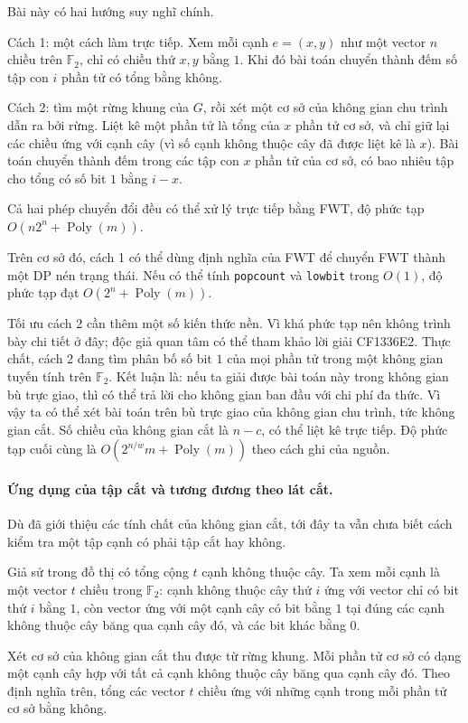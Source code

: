\documentclass[11pt]{article}
\begin{document}
Bài này có hai hướng suy nghĩ chính.

Cách 1: một cách làm trực tiếp. Xem mỗi cạnh $e=(x,y)$ như một vector $n$ chiều
trên $\mathbb F_2$, chỉ có chiều thứ $x,y$ bằng $1$. Khi đó bài toán chuyển
thành đếm số tập con $i$ phần tử có tổng bằng không.

Cách 2: tìm một rừng khung của $G$, rồi xét một cơ sở của không gian chu trình
dẫn ra bởi rừng. Liệt kê một phần tử là tổng của $x$ phần tử cơ sở, và chỉ giữ
lại các chiều ứng với cạnh cây (vì số cạnh không thuộc cây đã được liệt kê là
$x$). Bài toán chuyển thành đếm trong các tập con $x$ phần tử của cơ sở, có bao
nhiêu tập cho tổng có số bit $1$ bằng $i-x$.

Cả hai phép chuyển đổi đều có thể xử lý trực tiếp bằng FWT, độ phức tạp
$O(n2^n+\operatorname{Poly}(m))$.

Trên cơ sở đó, cách 1 có thể dùng định nghĩa của FWT để chuyển FWT thành một DP
nén trạng thái. Nếu có thể tính \texttt{popcount} và \texttt{lowbit} trong
$O(1)$, độ phức tạp đạt $O(2^n+\operatorname{Poly}(m))$.

Tối ưu cách 2 cần thêm một số kiến thức nền. Vì khá phức tạp nên không trình bày
chi tiết ở đây; độc giả quan tâm có thể tham khảo lời giải CF1336E2. Thực chất,
cách 2 đang tìm phân bố số bit $1$ của mọi phần tử trong một không gian tuyến
tính trên $\mathbb F_2$. Kết luận là: nếu ta giải được bài toán này trong không
gian bù trực giao, thì có thể trả lời cho không gian ban đầu với chi phí đa
thức. Vì vậy ta có thể xét bài toán trên bù trực giao của không gian chu trình,
tức không gian cắt. Số chiều của không gian cắt là $n-c$, có thể liệt kê trực
tiếp. Độ phức tạp cuối cùng là $O(2^{n/w}m+\operatorname{Poly}(m))$ theo cách
ghi của nguồn.

\paragraph{Ứng dụng của tập cắt và tương đương theo lát cắt.}
Dù đã giới thiệu các tính chất của không gian cắt, tới đây ta vẫn chưa biết cách
kiểm tra một tập cạnh có phải tập cắt hay không.

Giả sử trong đồ thị có tổng cộng $t$ cạnh không thuộc cây. Ta xem mỗi cạnh là
một vector $t$ chiều trong $\mathbb F_2$: cạnh không thuộc cây thứ $i$ ứng với
vector chỉ có bit thứ $i$ bằng $1$, còn vector ứng với một cạnh cây có bit bằng
$1$ tại đúng các cạnh không thuộc cây băng qua cạnh cây đó, và các bit khác bằng
$0$.

Xét cơ sở của không gian cắt thu được từ rừng khung. Mỗi phần tử cơ sở có dạng
một cạnh cây hợp với tất cả cạnh không thuộc cây băng qua cạnh cây đó. Theo định
nghĩa trên, tổng các vector $t$ chiều ứng với những cạnh trong mỗi phần tử cơ sở
bằng không.
\end{document}
